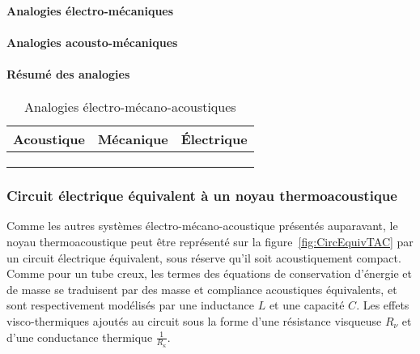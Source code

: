 {
\paragraph{Analogies électro-mécaniques}

\paragraph{Analogies acousto-mécaniques}

\paragraph{Résumé des analogies}

\begin{table}[!ht]
	\caption{Analogies électro-mécano-acoustiques}
	\label{tab:AnalogElectroMecanoAcoust}
	\centering
	\begin{tabular}{ C{.25\textwidth}  C{.25\textwidth}  C{.25\textwidth} }
	\hline
	Acoustique & Mécanique & \'Electrique \\ \hline\hline
	 &  &  \\
	 &  &  \\
	 &  &  \\
	\hline
	
	\end{tabular}
\end{table}
}

\subsubsection{Circuit électrique équivalent à un noyau thermoacoustique}

Comme les autres systèmes électro-mécano-acoustique présentés auparavant, le noyau thermoacoustique peut être représenté sur la figure~\ref{fig:CircEquivTAC} par un circuit électrique équivalent, sous réserve qu'il soit acoustiquement compact. Comme pour un tube creux, les termes des équations de conservation d'énergie et de masse se traduisent par des masse et compliance acoustiques équivalents, et sont respectivement modélisés par une inductance $L$ et une capacité $C$. Les effets visco-thermiques ajoutés au circuit sous la forme d'une résistance visqueuse $R_\nu$ et d'une conductance thermique $\frac{1}{R_\kappa}$.

